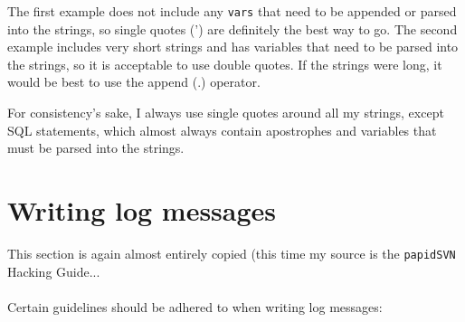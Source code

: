 \documentclass[headexclude,footexclude,12pt,BCOR0pt,DIV15]{scrartcl}
\begin{document}
        The first example does not include any \texttt{vars} that need to be appended or parsed into the strings,
        so single quotes (') are definitely the best way to go. The second example includes very short strings and
        has variables that need to be parsed into the strings, so it is acceptable to use double quotes. If the strings
        were long, it would be best to use the append (.) operator.

        For consistency's sake, I always use single quotes around all my strings, except SQL statements, which almost
        always contain apostrophes and variables that must be parsed into the strings.

\section{Writing log messages}
    This section is again almost entirely copied (this time my source
    is the \texttt{papidSVN} Hacking Guide...\\
    \\
    Certain guidelines should be adhered to when writing log messages:
\end{document}
